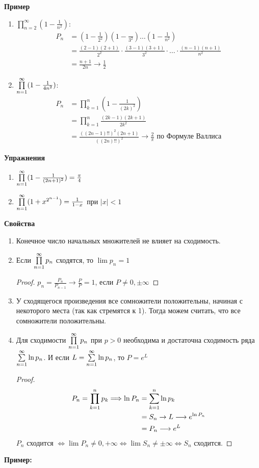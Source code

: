\textbf{Пример}
\begin{enumerate}
    \item $\prod \limits_{n=2}^\infty (1 - \frac{1}{n^2})$:
    \begin{align*}
        P_n &= (1 - \frac{1}{2^2})(1-\frac{}{3^2})\ldots (1-\frac{1}{n^2}) \\
        &= \frac{(2-1)(2+1)}{2^2}
        \cdot \frac{(3-1)(3+1)}{3^2} 
        \cdot \ldots \cdot \frac{(n-1)(n+1)}{n^2} \\
        &= \frac{n+1}{2n} \longrightarrow \frac{1}{2}
    \end{align*}
    \item $\prod \limits_{n=1}^\infty (1 - \frac{1}{4n^2})$:
    \begin{align*}
        P_n &= \prod \limits_{k=1}^n (1 - \frac{1}{(2k)^2}) \\
        &= \prod \limits_{k=1}^n \frac{(2k-1)(2k+1)}{2k^2} \\
        &= \frac{((2n-1)!!)^2(2n+1)}{((2n)!!)^2} \longrightarrow \frac{2}{\pi} \text{ по Формуле Валлиса}
    \end{align*}
\end{enumerate}
\textbf{Упражнения}
\begin{enumerate}
    \item $\prod \limits_{n=1}^\infty (1 - \frac{1}{(2n+1)^2}) = \frac{\pi}{4}$
    \item $\prod \limits_{n=1}^\infty (1+x^{2^{n-1}}) = \frac{1}{1-x}$ при $|x| < 1$
\end{enumerate}

\textbf{Свойства}
\begin{enumerate}
    \item Конечное число начальных множителей не влияет на сходимость.
    \item Если $\prod \limits_{n=1}^\infty p_n$ сходятся, то $\lim p_n = 1$
    \begin{proof}
        $p_n = \frac{P_n}{P_{n-1}} \to \frac{P}{P} = 1$, если $P \neq 0, \pm \infty$
    \end{proof}
    \item У сходящегося произведения все сомножители положительны, начиная с некоторого места (так как стремятся к 1). Тогда можем считать, что все сомножители положительны.
    \item Для сходимости $\prod \limits_{n=1}^\infty p_n$ при $p > 0$ необходима и достаточна сходимость ряда $\sum \limits_{n=1}^\infty \ln p_n$.
    И если $L = \sum \limits_{n=1}^\infty \ln p_n$, то $P = e^L$
    \begin{proof}
        \begin{align*}
            P_n = \prod \limits_{k=1}^n p_k \Longrightarrow \ln P_n &= \sum \limits_{k=1}^n \ln p_k \\
            &= S_n \to L \longrightarrow e^{\ln P_n} \\
            &= P_n \longrightarrow e^L
        \end{align*}
        $P_n$ сходится $\Longleftrightarrow \lim P_n \neq 0, +\infty \Longleftrightarrow \lim S_n \neq \pm \infty \Longleftrightarrow S_n$ сходится.
    \end{proof}
\end{enumerate}
\textbf{Пример:}

